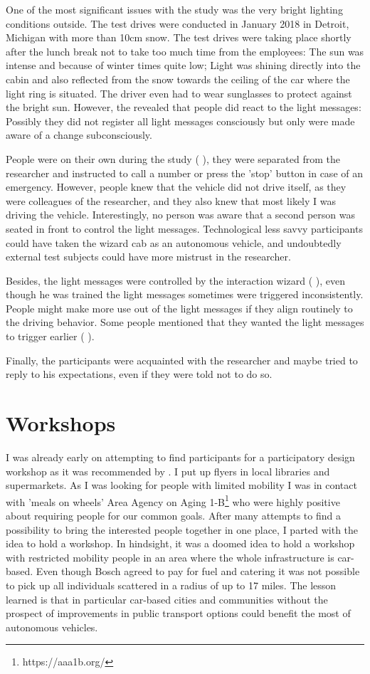One of the most significant issues with the study was the very bright lighting conditions outside. The test drives were conducted in January 2018 in Detroit, Michigan with more than 10cm snow. The test drives were taking place shortly after the lunch break not to take too much time from the employees: The sun was intense and because of winter times quite low; Light was shining directly into the cabin and also reflected from the snow towards the ceiling of the car where the light ring is situated. The driver even had to wear sunglasses to protect against the bright sun. However, the \emph{} revealed that people did react to the light messages: Possibly they did not register all light messages consciously but only were made aware of a change subconsciously. 

People were on their own during the study ( \emph{}), they were separated from the researcher and instructed to call a number or press the 'stop' button in case of an emergency. However, people knew that the vehicle did not drive itself, as they were colleagues of the researcher, and they also knew that most likely I was driving the vehicle. Interestingly, no person was aware that a second person was seated in front to control the light messages. Technological less savvy participants could have taken the wizard cab as an autonomous vehicle, and undoubtedly external test subjects could have more mistrust in the researcher.

Besides, the light messages were controlled by the interaction wizard ( \emph{}), even though he was trained the light messages sometimes were triggered inconsistently. People might make more use out of the light messages if they align routinely to the driving behavior. Some people mentioned that they wanted the light messages to trigger earlier ( \emph{}). 

Finally, the participants were acquainted with the researcher and maybe tried to reply to his expectations, even if they were told not to do so. 

\section{Workshops}
I was already early on attempting to find participants for a participatory design workshop as it was recommended by \cite{Pettersson}. I put up flyers in local libraries and supermarkets. As I was looking for people with limited mobility I was in contact with 'meals on wheels' Area Agency on Aging 1-B\footnote{https://aaa1b.org/} who were highly positive about requiring people for our common goals. After many attempts to find a possibility to bring the interested people together in one place, I parted with the idea to hold a workshop. In hindsight, it was a doomed idea to hold a workshop with restricted mobility people in an area where the whole infrastructure is car-based. Even though Bosch agreed to pay for fuel and catering it was not possible to pick up all individuals scattered in a radius of up to 17 miles. The lesson learned is that in particular car-based cities and communities without the prospect of improvements in public transport options could benefit the most of autonomous vehicles. 

